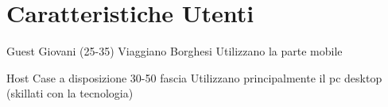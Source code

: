 \documentclass[1_relazione.tex]{subfiles}
\begin{document}
\section{Caratteristiche Utenti}

Guest
Giovani (25-35)
Viaggiano
Borghesi
Utilizzano la parte mobile

Host
Case a disposizione
30-50 fascia
Utilizzano principalmente il pc desktop (skillati con la tecnologia)
\end{document}
